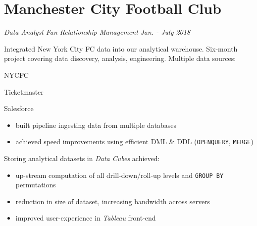 \documentclass[../cv.tex]{subfiles}
\begin{document}
\section{Manchester City Football Club}
\textit{Data Analyst}
\hfill
\textit{Fan Relationship Management}
\hfill
\textit{Jan. - July 2018}
\begin{description}[style=multiline,leftmargin=3cm]
	\item[NYCFC ETL \textnormal{\\Project Owner}]
	      Integrated New York City FC data into our analytical warehouse.
	      Six-month project covering data discovery, analysis, engineering.
	      Multiple data sources:
	      \begin{itemize*}
		      \item NYCFC
		      \item Ticketmaster
		      \item Salesforce
	      \end{itemize*}
	      \begin{description}[style=multiline,leftmargin=2cm]
		      \item[Pipeline]
		            {
		            \begin{itemize}
			            \item built pipeline ingesting data from multiple databases%
			            \item achieved speed improvements using efficient DML \& DDL (\texttt{OPENQUERY}, \texttt{MERGE})
		            \end{itemize}
		            }
		      \item[Cubes]
		            Storing analytical datasets in \textit{Data Cubes} achieved:
		            \begin{itemize}
			            \item up-stream computation of all drill-down/roll-up levels and \texttt{GROUP BY} permutations
			            \item reduction in size of dataset, increasing bandwidth across servers
			            \item improved user-experience in \textit{Tableau} front-end
		            \end{itemize}

\end{description}
\end{description}
\end{document}
